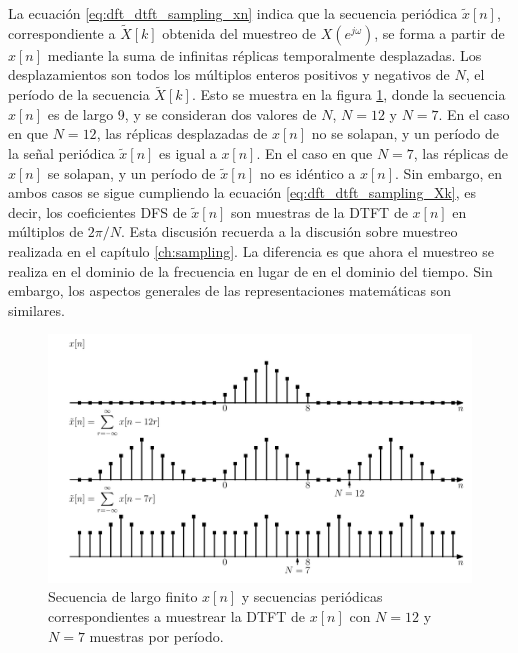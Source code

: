 \documentclass[a4paper]{report}
\begin{document}
La ecuación \ref{eq:dft_dtft_sampling_xn} indica que la secuencia periódica \(\tilde{x}[n]\), correspondiente a \(\tilde{X}[k]\) obtenida del muestreo de \(X(e^{j\omega})\), se forma a partir de \(x[n]\) mediante la suma de infinitas réplicas temporalmente desplazadas. Los desplazamientos son todos los múltiplos enteros positivos y negativos de \(N\), el período de la secuencia \(\tilde{X}[k]\). Esto se muestra en la figura \ref{fig:dft_dtft_sampling_example}, donde la secuencia \(x[n]\) es de largo 9, y se consideran dos valores de \(N\), \(N=12\) y \(N=7\). En el caso en que \(N=12\), las réplicas desplazadas de \(x[n]\) no se solapan, y un período de la señal periódica \(\tilde{x}[n]\) es igual a \(x[n]\). En el caso en que \(N=7\), las réplicas de \(x[n]\) se solapan, y un período de \(\tilde{x}[n]\) no es idéntico a \(x[n]\). Sin embargo, en ambos casos se sigue cumpliendo la ecuación \ref{eq:dft_dtft_sampling_Xk}, es decir, los coeficientes DFS de \(\tilde{x}[n]\) son muestras de la DTFT de \(x[n]\) en múltiplos de \(2\pi/N\). Esta discusión recuerda a la discusión sobre muestreo realizada en el capítulo \ref{ch:sampling}. La diferencia es que ahora el muestreo se realiza en el dominio de la frecuencia en lugar de en el dominio del tiempo. Sin embargo, los aspectos generales de las representaciones matemáticas son similares.
\begin{figure}[!htb]
 \begin{center}
 \includegraphics[width=\textwidth]{figuras/dft_dtft_sampling_example.pdf}
 \caption{\label{fig:dft_dtft_sampling_example} Secuencia de largo finito \(x[n]\) y secuencias periódicas correspondientes a muestrear la DTFT de \(x[n]\) con \(N=12\) y \(N=7\) muestras por período.}
 \end{center}
\end{figure}
\end{document}
